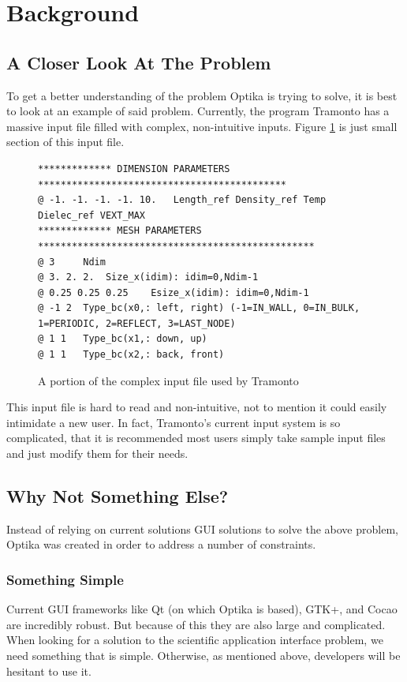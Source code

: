 \section{Background}
\subsection{A Closer Look At The Problem}
To get a better understanding of the problem Optika is trying to solve, it is
best to look at an example of said problem. Currently, the program Tramonto has
a massive input file filled with complex, non-intuitive inputs. Figure
\ref{tramontoInputFigure} is just small section of this input file.
\begin{figure}
  \centering
  {\footnotesize
  \begin{verbatim}
************* DIMENSION PARAMETERS ********************************************
@ -1. -1. -1. -1. 10. 	Length_ref Density_ref Temp Dielec_ref VEXT_MAX 
************* MESH PARAMETERS *************************************************
@ 3 	Ndim 
@ 3. 2. 2. 	Size_x(idim): idim=0,Ndim-1 
@ 0.25 0.25 0.25 	Esize_x(idim): idim=0,Ndim-1 
@ -1 2 	Type_bc(x0,: left, right) (-1=IN_WALL, 0=IN_BULK, 1=PERIODIC, 2=REFLECT, 3=LAST_NODE) 
@ 1 1 	Type_bc(x1,: down, up) 
@ 1 1 	Type_bc(x2,: back, front) 
  \end{verbatim}
  }
  \caption[Tramonto Input]{A portion of the complex input file used by Tramonto}
  \label{tramontoInputFigure}
\end{figure}

This input file is hard to read and non-intuitive, not to mention it could 
easily intimidate a new user. In fact, Tramonto's current input system is so complicated, 
that it is recommended most users simply take sample input files and just 
modify them for their needs.

\subsection{Why Not Something Else?}
Instead of relying on current solutions GUI solutions to solve the above problem, Optika was created in order to address
a number of constraints.
\subsubsection{Something Simple}
Current GUI frameworks like Qt (on which Optika is based), GTK+, and Cocao are incredibly robust. But
because of this they are also large and complicated. When looking for a solution to the 
scientific application interface problem, we need something that is simple. Otherwise, as mentioned
above, developers will be hesitant to use it.

